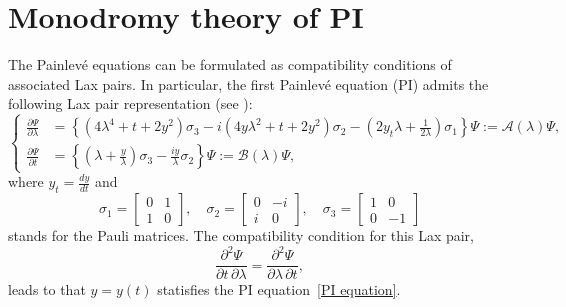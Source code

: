 \documentclass[12pt]{article}
\theoremstyle{plain}
\theoremstyle{definition}
\numberwithin{equation}{section}
\begin{document}
\appendix

\section{Monodromy theory of PI}
\label{sec:AppA}


The Painlev\'e equations can be formulated as compatibility conditions of associated Lax pairs. In particular, the first Painlev\'e equation (PI) admits the following Lax pair representation (see \cite{Kapaev-Kitaev-1993}):
\begin{equation}\label{lax pair-I}
\left\{\begin{aligned}
\frac{\partial\Psi}{\partial\lambda}
&=\left\{(4\lambda^4+t+2y^2)\sigma_{3}-i(4y\lambda^2+t+2y^2)\sigma_{2}
-\left(2y_{t}\lambda+\frac{1}{2\lambda}\right)\sigma_{1}\right\}\Psi
:=\mathcal{A}(\lambda)\Psi,
\\
\frac{\partial\Psi}{\partial t}
&=\left\{\left(\lambda+\frac{y}{\lambda}\right)\sigma_{3}-\frac{iy}{\lambda}\sigma_{2}\right\}\Psi
:=\mathcal{B}(\lambda)\Psi,
\end{aligned}\right.
\end{equation}
where $y_{t}=\frac{dy}{dt}$ and
\[
\sigma_{1}=\begin{bmatrix}0&1\\1&0\end{bmatrix},\quad \sigma_{2}=\begin{bmatrix}0&-i\\i&0\end{bmatrix},\quad
\sigma_{3}=\begin{bmatrix}1&0\\0&-1\end{bmatrix}
\]
stands for the Pauli matrices.
The compatibility condition for this Lax pair,
\[
\frac{\partial^2 \Psi}{\partial t \, \partial \lambda} = \frac{\partial^2 \Psi}{\partial \lambda \, \partial t},
\]
leads to that \( y = y(t) \) statisfies the PI equation~\eqref{PI equation}.
\end{document}

